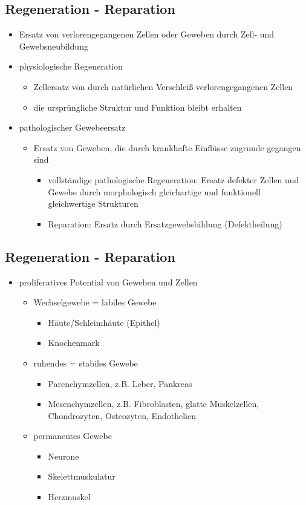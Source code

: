 \begin{it>emize}
\begin{itemize}
\subsection{Regeneration - Reparation}
\begin{itemize}
\item Ersatz von verlorengegangenen Zellen oder Geweben durch Zell- und Gewebsneubildung
\item physiologische Regeneration
\begin{itemize}
\item Zellersatz von durch natürlichen Verschleiß verlorengegangenen Zellen
\item die ursprüngliche Struktur und Funktion bleibt erhalten
\end{itemize}
\item pathologischer Gewebeersatz
\begin{itemize}
\item Ersatz von Geweben, die durch krankhafte Einflüsse zugrunde gegangen sind
\begin{itemize}
\item vollständige pathologische Regeneration: Ersatz defekter Zellen und Gewebe durch morphologisch gleichartige und funktionell gleichwertige Strukturen
\item Reparation: Ersatz durch Ersatzgewebsbildung (Defektheilung)
\end{itemize}
\end{itemize}
\end{itemize}

\subsection{Regeneration - Reparation}
\begin{itemize}
\item proliferatives Potential von Geweben und Zellen
\begin{itemize}
\item Wechselgewebe = labiles Gewebe
\begin{itemize}
\item Häute/Schleimhäute (Epithel)
\item Knochenmark
\end{itemize}
\item ruhendes = stabiles Gewebe
\begin{itemize}
\item Parenchymzellen, z.B. Leber, Pankreas
\item Mesenchymzellen, z.B. Fibroblasten, glatte Muskelzellen, Chondrozyten, Osteozyten, Endothelien
\end{itemize}
\item permanentes Gewebe
\begin{itemize}
\item Neurone
\item Skelettmuskulatur
\item Herzmuskel
\end{itemize}
\end{itemize}
\end{itemize}


\end{itemize}
\end{it>emize}
